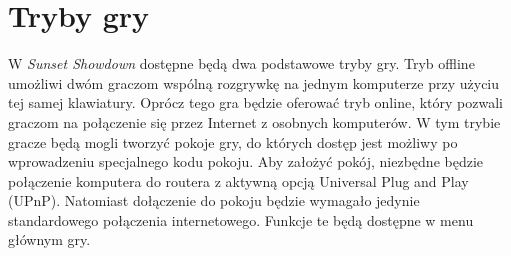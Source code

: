 \section{Tryby gry}
W \emph{Sunset Showdown} dostępne będą dwa podstawowe tryby gry. Tryb offline umożliwi dwóm graczom wspólną rozgrywkę na jednym komputerze przy użyciu tej samej klawiatury. Oprócz tego gra będzie oferować tryb online, który pozwali graczom na połączenie się przez Internet z osobnych komputerów. W tym trybie gracze będą mogli tworzyć pokoje gry, do których dostęp jest możliwy po wprowadzeniu specjalnego kodu pokoju. Aby założyć pokój, niezbędne będzie połączenie komputera do routera z aktywną opcją Universal Plug and Play (UPnP). Natomiast dołączenie do pokoju będzie wymagało jedynie standardowego połączenia internetowego. Funkcje te będą dostępne w menu głównym gry.